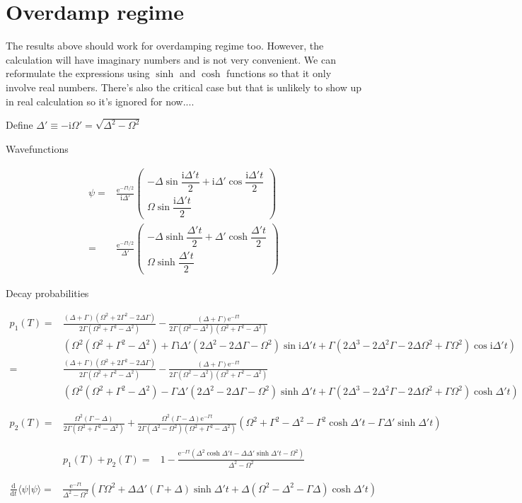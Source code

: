 \documentclass[10pt,fleqn]{article}
\newcommand{\ud}{\mathrm{d}}
\newcommand{\ue}{\mathrm{e}}
\newcommand{\ui}{\mathrm{i}}
\newcommand{\eqar}[1]
{
  \begin{align*}
    #1
  \end{align*}
}
\newcommand{\paren}[1]{{\left({#1}\right)}}
\newcommand{\diff}[3][{}]{{\frac{\ud^{#1} {#2}}{\ud {#3}{}^{#1}}}}
\begin{document}
\section{Overdamp regime}
The results above should work for overdamping regime too.
However, the calculation will have imaginary numbers and is not very convenient.
We can reformulate the expressions using $\sinh$ and $\cosh$ functions so that it only involve
real numbers. There's also the critical case but that is unlikely to show up in real calculation
so it's ignored for now....

Define $\Delta'\equiv-\ui\Omega'=\sqrt{\Delta^2-\Omega^2}$

Wavefunctions
\eqar{
  \psi=&\frac{\ue^{-\Gamma t/2}}{\ui\Delta'}\begin{pmatrix}
    -\Delta\sin\dfrac{\ui\Delta't}{2}+\ui\Delta'\cos\dfrac{\ui\Delta't}{2}\\
    \Omega\sin\dfrac{\ui\Delta't}{2}
  \end{pmatrix}\\
  =&\frac{\ue^{-\Gamma t/2}}{\Delta'}\begin{pmatrix}
    -\Delta\sinh\dfrac{\Delta't}{2}+\Delta'\cosh\dfrac{\Delta't}{2}\\
    \Omega\sinh\dfrac{\Delta't}{2}
  \end{pmatrix}
}
Decay probabilities
\eqar{
  p_1(T)=&\frac{\paren{\Delta+\Gamma}\paren{\Omega^2+2\Gamma^2-2\Delta\Gamma}}{2\Gamma\paren{\Omega^2+\Gamma^2-\Delta^2}}-\frac{\paren{\Delta+\Gamma}\ue^{-\Gamma t}}{2\Gamma\paren{\Omega^2-\Delta^2}\paren{\Omega^2+\Gamma^2-\Delta^2}}\\
  &\paren{\Omega^2\paren{\Omega^2+\Gamma^2-\Delta^2}+\Gamma\ui\Delta'\paren{2\Delta^2-2\Delta\Gamma-\Omega^2}\sin\ui\Delta't+\Gamma\paren{2\Delta^3-2\Delta^2\Gamma-2\Delta\Omega^2+\Gamma\Omega^2}\cos\ui\Delta't}\\
  =&\frac{\paren{\Delta+\Gamma}\paren{\Omega^2+2\Gamma^2-2\Delta\Gamma}}{2\Gamma\paren{\Omega^2+\Gamma^2-\Delta^2}}-\frac{\paren{\Delta+\Gamma}\ue^{-\Gamma t}}{2\Gamma\paren{\Omega^2-\Delta^2}\paren{\Omega^2+\Gamma^2-\Delta^2}}\\
  &\paren{\Omega^2\paren{\Omega^2+\Gamma^2-\Delta^2}-\Gamma\Delta'\paren{2\Delta^2-2\Delta\Gamma-\Omega^2}\sinh\Delta't+\Gamma\paren{2\Delta^3-2\Delta^2\Gamma-2\Delta\Omega^2+\Gamma\Omega^2}\cosh\Delta't}
}
\eqar{
  p_2(T)=&\frac{\Omega^2\paren{\Gamma-\Delta}}{2\Gamma\paren{\Omega^2+\Gamma^2-\Delta^2}}+\frac{\Omega^2\paren{\Gamma-\Delta}\ue^{-\Gamma t}}{2\Gamma\paren{\Delta^2-\Omega^2}\paren{\Omega^2+\Gamma^2-\Delta^2}}\paren{\Omega^2+\Gamma^2-\Delta^2-\Gamma^2\cosh\Delta't-\Gamma\Delta'\sinh\Delta't}
}
\eqar{
  p_1(T)+p_2(T)=&1-\frac{\ue^{-\Gamma t}\paren{\Delta^2\cosh\Delta't-\Delta\Delta'\sinh\Delta't-\Omega^2}}{\Delta^2-\Omega^2}
}
\eqar{
  \diff{}{t}\langle\psi|\psi\rangle=&\frac{\ue^{-\Gamma t}}{\Delta^2-\Omega^2}\paren{
    \Gamma\Omega^2+\Delta\Delta'\paren{\Gamma+\Delta}\sinh\Delta't+\Delta\paren{\Omega^2-\Delta^2-\Gamma\Delta}\cosh\Delta't
  }
}
\end{document}

